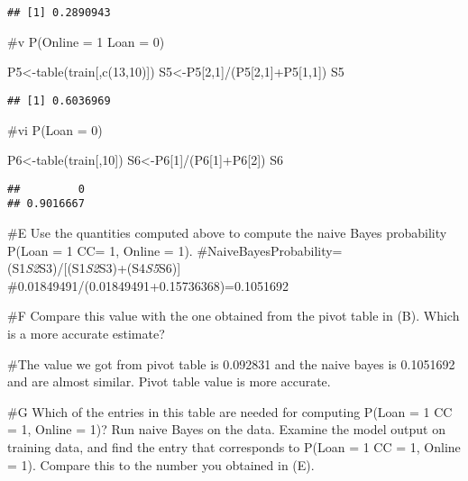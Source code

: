 \documentclass[
]{article}
\newenvironment{Shaded}{\begin{snugshade}}{\end{snugshade}}
\newcommand{\DecValTok}[1]{\textcolor[rgb]{0.00,0.00,0.81}{#1}}
\newcommand{\FunctionTok}[1]{\textcolor[rgb]{0.00,0.00,0.00}{#1}}
\newcommand{\NormalTok}[1]{#1}
\newcommand{\OtherTok}[1]{\textcolor[rgb]{0.56,0.35,0.01}{#1}}
\newcommand{\SpecialCharTok}[1]{\textcolor[rgb]{0.00,0.00,0.00}{#1}}
\begin{document}
\begin{verbatim}
## [1] 0.2890943
\end{verbatim}

\#v P(Online = 1 \textbar{} Loan = 0)

\begin{Shaded}
\begin{Highlighting}[]
\NormalTok{P5}\OtherTok{\textless{}{-}}\FunctionTok{table}\NormalTok{(train[,}\FunctionTok{c}\NormalTok{(}\DecValTok{13}\NormalTok{,}\DecValTok{10}\NormalTok{)])}
\NormalTok{S5}\OtherTok{\textless{}{-}}\NormalTok{P5[}\DecValTok{2}\NormalTok{,}\DecValTok{1}\NormalTok{]}\SpecialCharTok{/}\NormalTok{(P5[}\DecValTok{2}\NormalTok{,}\DecValTok{1}\NormalTok{]}\SpecialCharTok{+}\NormalTok{P5[}\DecValTok{1}\NormalTok{,}\DecValTok{1}\NormalTok{])}
\NormalTok{S5}
\end{Highlighting}
\end{Shaded}

\begin{verbatim}
## [1] 0.6036969
\end{verbatim}

\#vi P(Loan = 0)

\begin{Shaded}
\begin{Highlighting}[]
\NormalTok{P6}\OtherTok{\textless{}{-}}\FunctionTok{table}\NormalTok{(train[,}\DecValTok{10}\NormalTok{])}
\NormalTok{S6}\OtherTok{\textless{}{-}}\NormalTok{P6[}\DecValTok{1}\NormalTok{]}\SpecialCharTok{/}\NormalTok{(P6[}\DecValTok{1}\NormalTok{]}\SpecialCharTok{+}\NormalTok{P6[}\DecValTok{2}\NormalTok{])}
\NormalTok{S6}
\end{Highlighting}
\end{Shaded}

\begin{verbatim}
##         0 
## 0.9016667
\end{verbatim}

\#E Use the quantities computed above to compute the naive Bayes
probability P(Loan = 1 \textbar{} CC= 1, Online = 1).
\#NaiveBayesProbability=
(S1\emph{S2}S3)/{[}(S1\emph{S2}S3)+(S4\emph{S5}S6){]}
\#0.01849491/(0.01849491+0.15736368)=0.1051692

\#F Compare this value with the one obtained from the pivot table in
(B). Which is a more accurate estimate?

\#The value we got from pivot table is 0.092831 and the naive bayes is
0.1051692 and are almost similar. Pivot table value is more accurate.

\#G Which of the entries in this table are needed for computing P(Loan =
1 \textbar{} CC = 1, Online = 1)? Run naive Bayes on the data. Examine
the model output on training data, and find the entry that corresponds
to P(Loan = 1 \textbar{} CC = 1, Online = 1). Compare this to the number
you obtained in (E).
\end{document}
